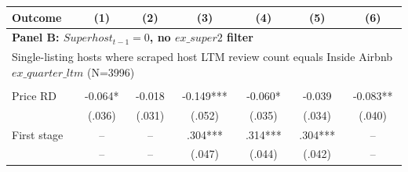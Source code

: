 \begin{tabular}{lcccccc}
\hline
Outcome & (1) & (2) & (3) & (4) & (5) & (6)
\\ \hline
\multicolumn{7}{l}{\textbf{Panel B: $Superhost_{t-1}=0$, no $ex\_super2$ filter}} \\
\multicolumn{7}{l}{Single-listing hosts where scraped host LTM review count equals Inside Airbnb $ex\_quarter\_ltm$ (N=3996)} \\
\\
Price RD & -0.064* & -0.018 & -0.149*** & -0.060* & -0.039 & -0.083**
\\
 & (.036) & (.031) & (.052) & (.035) & (.034) & (.040)
\\
First stage & -- & -- & .304*** & .314*** & .304*** & --
\\
 & -- & -- & (.047) & (.044) & (.042) & --
\\
\hline
\end{tabular}
